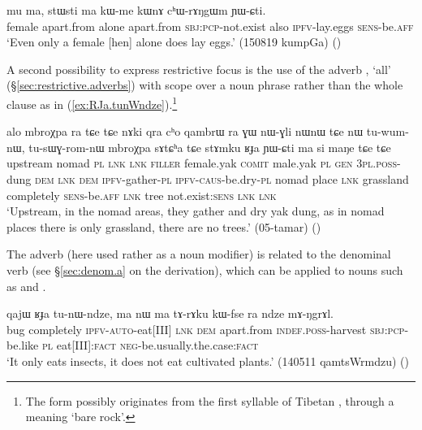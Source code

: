   \begin{exe}
\ex \label{ex:ma.kWme.kWnA}
\gll  mu ma, stɯsti ma kɯ-me kɯnɤ cʰɯ-rɤŋgɯm ɲɯ-ɕti. \\
female apart.from alone apart.from \textsc{sbj}:\textsc{pcp}-not.exist also \textsc{ipfv}-lay.eggs \textsc{sens}-be.\textsc{aff} \\
\glt `Even only a female [hen] alone does lay eggs.' (150819 kumpGa)
()
\end{exe}
   
A second possibility to express restrictive focus is the use of the adverb , `all' (§\ref{sec:restrictive.adverbs}) with scope over a noun phrase rather than the whole clause as in (\ref{ex:RJa.tunWndze}).\footnote{The form  possibly originates from the first syllable of Tibetan , through a meaning `bare rock'.}  

\begin{exe}
\ex \label{ex:stAmku.RJa}
\gll alo mbroχpa ra tɕe tɕe nɤki qra cʰo qambrɯ ra ɣɯ nɯ-ɣli nɯnɯ tɕe nɯ tu-wum-nɯ, tu-sɯɣ-rom-nɯ mbroχpa sɤtɕʰa tɕe stɤmku ʁɟa ɲɯ-ɕti ma si maŋe tɕe tɕe    \\
upstream nomad \textsc{pl} \textsc{lnk} \textsc{lnk} \textsc{filler} female.yak \textsc{comit} male.yak \textsc{pl} \textsc{gen} \textsc{3pl}.\textsc{poss}-dung \textsc{dem} \textsc{lnk} \textsc{dem} \textsc{ipfv}-gather-\textsc{pl} \textsc{ipfv}-\textsc{caus}-be.dry-\textsc{pl} nomad place \textsc{lnk} grassland completely \textsc{sens}-be.\textsc{aff} \textsc{lnk} tree not.exist:\textsc{sens} \textsc{lnk} \textsc{lnk}  \\
\glt `Upstream, in the nomad areas, they gather and dry yak dung, as in nomad places there is only grassland, there are no trees.' (05-tamar) ()
\end{exe}

The adverb  (here used rather as a noun modifier) is related to the denominal verb  (see §\ref{sec:denom.a} on the  derivation), which can be applied to nouns such as  and .
 
\begin{exe}
\ex \label{ex:RJa.tunWndze}
 \gll qajɯ ʁɟa tu-nɯ-ndze, ma nɯ ma tɤ-rɤku kɯ-fse ra ndze mɤ-ŋgrɤl. \\
 bug completely \textsc{ipfv}-\textsc{auto}-eat[III] \textsc{lnk} \textsc{dem} apart.from \textsc{indef}.\textsc{poss}-harvest \textsc{sbj}:\textsc{pcp}-be.like \textsc{pl} eat[III]:\textsc{fact} \textsc{neg}-be.usually.the.case:\textsc{fact} \\ 
\glt `It only eats insects, it does not eat cultivated plants.' (140511 qamtsWrmdzu)
()
\end{exe}

